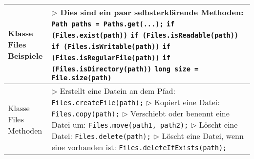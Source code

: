 \begin{table}[H]
\begin{tabular}{ | p{4cm} p{13.5cm} | }
	\makecell[l]{Klasse Files \\ Beispiele} & 
	\makecell[l]
	{
	$\rhd$ Dies sind ein paar selbsterklärende Methoden: \\
	\hspace{0.5cm} \texttt{Path paths = Paths.get(...);} \\
	\hspace{0.5cm} \texttt{if (Files.exist(path))} \\
	\hspace{0.5cm} \texttt{if (Files.isReadable(path))} \\
	\hspace{0.5cm} \texttt{if (Files.isWritable(path))} \\
	\hspace{0.5cm} \texttt{if (Files.isRegularFile(path))} \\
	\hspace{0.5cm} \texttt{if (Files.isDirectory(path))} \\
	\hspace{0.5cm} \texttt{long size = File.size(path)} \\
	} 	\\ \hline


	\makecell[l]{Klasse Files \\ Methoden} & 
	\makecell[l]
	{
	$\rhd$ Erstellt eine Datein an dem Pfad: \\
	\hspace{0.5cm} \texttt{Files.createFile(path);} \\
	$\rhd$ Kopiert eine Datei: \\
	\hspace{0.5cm} \texttt{Files.copy(path);} \\
	$\rhd$ Verschiebt oder benennt eine Datei um: \\
	\hspace{0.5cm} \texttt{Files.move(path1, path2);} \\
	$\rhd$ Löscht eine Datei: \\
	\hspace{0.5cm} \texttt{Files.delete(path);} \\
	$\rhd$ Löscht eine Datei, wenn eine vorhanden ist: \\
	\hspace{0.5cm} \texttt{Files.deleteIfExists(path);} \\
	} 	\\ \hline


	\end{tabular}
	\end{table}



